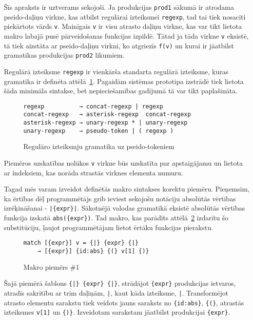 Šīs apraksts ir uztverams sekojoši. Ja produkcijas \verb|prod1| sākumā ir atrodama pseido-daļiņu virkne, kas atbilst regulārai izteiksmei \verb|regexp|, tad tai tiek nosacīti piekārtots vārds \verb|v|. Mainīgais \verb|v| ir visu atrasto daļiņu virkne, kas var tikt lietota makro labajā pusē pārveidošanas funkcijas izpildē. Tātad ja tāda virkne \verb|v| eksistē, tā tiek aizstāta ar pseido-daļiņu virkni, ko atgriezīs \verb|f(v)| un kurai ir jāatbilst gramatikas produkcijas \verb|prod2| likumiem. 

Regulārā izteiksme \verb|regexp| ir vienkārša standarta regulārā izteiksme, kuras gramatika ir definēta attēlā~\ref{fig:regexpsyntax}. Pagaidām sistēmas prototipa izstrādē tiek lietota šāda minimāla sintakse, bet nepieciešamības gadījumā tā var tikt paplašināta.

\begin{figure}[h!]
\begin{verbatim}
regexp          → concat-regexp | regexp
concat-regexp   → asterisk-regexp  concat-regexp
asterisk-regexp → unary-regexp * | unary-regexp
unary-regexp    → pseudo-token | ( regexp )
\end{verbatim}
\caption{\label{fig:regexpsyntax}Regulāro izteiksmju gramatika uz pseido-tokeniem}
\end{figure}

Piemēros uzskatības nolūkos \verb|v| virkne būs uzskatīta par apstaigājamu un lietota ar indeksiem, kas norāda strastās virknes elementa numuru.

Tagad mēs varam izveidot definētās makro sintakses korektu piemēru. Pieņemsim, ka ērtības dēļ programmētājs grib ieviest sekojošu notāciju absolūtās vērtības izrēķināšanai - \verb/|{expr}|/. Sākotnējā valodas gramatikā eksistē absolūtās vērtības funkcija izskatā \verb|abs({expr})|. Tad makro, kas parādīts attēlā~\ref{fig:matchsample1} izdarītu šo substitūciju, ļaujot programmētājam lietot ērtāku funkcijas pierakstu.

\begin{figure}[h!]
\begin{verbatim}
match [{expr}] v = {|} {expr} {|}
    → [{expr}] {id:abs} {(} v[1] {)}
\end{verbatim}
\caption{\label{fig:matchsample1}Makro piemērs \#1}
\end{figure}

Šajā piemērā šablons \verb/{|} {expr} {|}/, strādājot \verb|{expr}| produkcijas ietvaros, atradīs sakritību ar trim daļiņām, \verb/|/, kaut kāda izteiksme, \verb/|/. Transformējot atrasto elementu sarakstu tiek veidots jauns saraksts no \verb|{id:abs}|, \verb|{(}|, atrastās izteiksmes \verb|v[1]| un \verb|{)}|. Izveidotam sarakstam jāatbilst produkcijai \verb|{expr}|.

